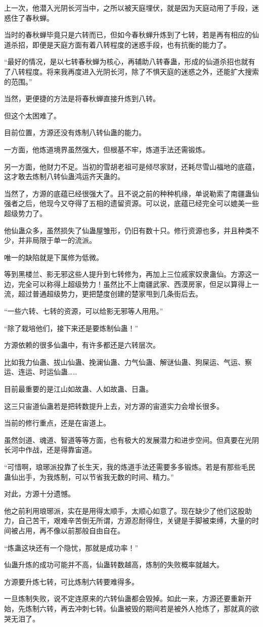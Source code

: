 \begin{this_body}
上一次，他潜入光阴长河当中，之所以被天庭埋伏，就是因为天庭动用了手段，迷惑住了春秋蝉。

当时的春秋蝉毕竟只是六转而已，但如今春秋蝉升炼到了七转，若是再有相应的仙道杀招，即便是天庭方面有着八转程度的迷惑手段，也有抗衡的能力了。

“最好的情况，是以七转春秋蝉为核心，再辅助八转春蛊，形成的仙道杀招也就有了八转程度。将来我再度进入光阴长河，除了不惧天庭的迷惑之外，还能扩大搜索的范围。”

当然，更便捷的方法是将春秋蝉直接升炼到八转。

但这个太困难了。

目前位置，方源还没有炼制八转仙蛊的能力。

一方面，他炼道境界虽然强大，但根基不牢，炼道手法还需锻炼。

另一方面，他财力不足。当初的雪胡老祖可是倾尽家财，还耗尽雪山福地的底蕴，这才敢去炼制八转仙蛊鸿运齐天蛊的。

当然了，方源的底蕴已经很强大了。且不说之前的种种机缘，单说勒索了南疆蛊仙强者之后，他现今又夺得了五相的遗留资源。可以说，底蕴已经完全可以媲美一些超级势力了。

他仙蛊众多，虽然损失了仙蛊屋雏形，仍旧有数十只。修行资源也多，并且种类不少，并非局限于单一的流派。

唯一的缺陷就是下属修为低微。

等到黑楼兰、影无邪这些人提升到七转修为，再加上三位戚家奴隶蛊仙。方源这一边，完全可以称得上超级势力！虽然比不上南疆武家、西漠房家，但足以算得上一流，超过普通超级势力，更把楚度创建的楚家甩到几条街后去。

“一些六转、七转的资源，可以给影无邪等人用用。”

“除了栽培他们，接下来还是要炼制仙蛊！”

方源依赖的很多仙蛊中，有许多都还是六转层次。

比如我力仙蛊、拔山仙蛊、挽澜仙蛊、力气仙蛊、解谜仙蛊、狗屎运、气运、察运、连运、时运仙蛊……

目前最重要的是江山如故蛊、人如故蛊、日蛊。

这三只宙道仙蛊若是把转数提升上去，对方源的宙道实力会增长很多。

当前的修行重点，还是在宙道上。

虽然剑道、魂道、智道等等方面，也有极大的发展潜力和进步空间。但真要在光阴长河中作战，还是得靠宙道。

“可惜啊，琅琊派投靠了长生天，我的炼道手法还需要多多锻炼。若是有那些毛民蛊仙出手，为我炼制，可以节省我无数的时间、精力。”

对此，方源十分遗憾。

他之前利用琅琊派，实在是用得太顺手，太顺心如意了。现在缺少了他们这股助力，自己苦干，艰难辛苦倒无所谓，方源忍耐得住，关键是手脚被束缚，大量的时间被占用，再不像以前那般自由自在。

“炼蛊这块还有一个隐忧，那就是成功率！”

仙蛊升炼的成功可能并不高，仙蛊转数越高，炼制的失败概率就越大。

方源要升炼七转，可比炼制六转要难得多。

一旦炼制失败，说不定连原来的六转仙蛊都会毁掉。如此一来，方源还要重新开始，先炼制六转，再去冲刺七转。仙蛊被毁的期间若是被外人抢炼了，那就真的欲哭无泪了。

\end{this_body}

